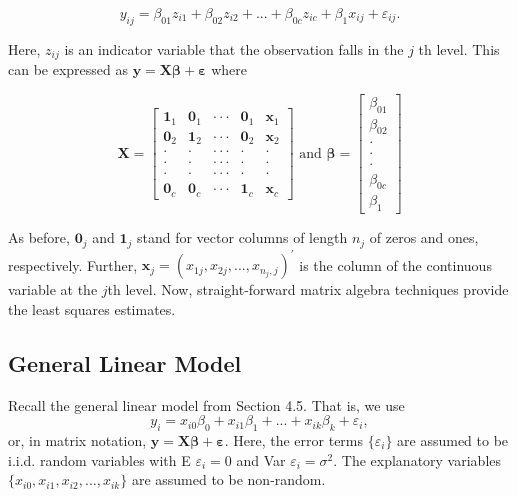 \begin{center}
\[
y_{ij}=\beta _{01}z_{i1}+\beta _{02}z_{i2}+...+\beta
_{0c}z_{ic}+\beta _{1}x_{ij}+\varepsilon_{ij}.
\]
\end{center}

\noindent Here, $z_{ij}$ is an indicator variable that the observation falls in the $j$%
th level. This can be expressed as $\mathbf{y}=%
\mathbf{X \boldsymbol \beta + \boldsymbol \varepsilon}$ where

\begin{center}
\[
\mathbf{X}=%
\begin{bmatrix}
\mathbf{1}_1 & \mathbf{0}_{1} & \cdot \cdot \cdot  & \mathbf{0}%
_{1} & \mathbf{x}_{1} \\
\mathbf{0}_{2} & \mathbf{1}_2 & \cdot \cdot \cdot  & \mathbf{0}%
_{2} & \mathbf{x}_{2} \\
\cdot  & \cdot  & \cdot \cdot \cdot  & \cdot  & \cdot  \\
\cdot  & \cdot  & \cdot \cdot \cdot  & \cdot  & \cdot  \\
\cdot  & \cdot  & \cdot \cdot \cdot  & \cdot  & \cdot  \\
\mathbf{0}_{c} & \mathbf{0}_{c} & \cdot \cdot \cdot  & \mathbf{1}_c & \mathbf{x}_{c}%
\end{bmatrix}%
\text{ \ \ \ \ and \ \ \ }\boldsymbol \beta=%
\begin{bmatrix}
\beta _{01} \\
\beta _{02} \\
\cdot  \\
\cdot  \\
\cdot  \\
\beta _{0c} \\
\beta _{1}%
\end{bmatrix}
\]
\end{center}

\noindent As before, $\mathbf{0}_{j}$ and $\mathbf{1}_j$ stand for
vector columns of length $n_{j}$ of zeros and ones, respectively.
Further, $\mathbf{x}_{j}=(x_{1j},x_{2j},...,x_{n_{j},j})^{\prime }$
is the column of the continuous variable at the $j$th level. Now,
straight-forward matrix algebra techniques provide the least squares
estimates.

\subsection{General Linear Model}

Recall the general linear model from Section 4.5. That is, we use
\begin{equation*}
y_{i}=x_{i0}\beta _{0}+x_{i1}\beta _{1}+...+x_{ik}\beta
_{k}+\varepsilon_{i},
\end{equation*}
\noindent or, in matrix notation, $ \mathbf{y=X \boldsymbol \beta +
\boldsymbol \varepsilon.}$ Here, the error terms
$\{\varepsilon_{i}\}$ are assumed to be i.i.d. random variables
with E $\varepsilon_{i}=0$ and Var $\varepsilon_{i}=\sigma ^{2}$. The explanatory variables $%
\{x_{i0},x_{i1},x_{i2},...,x_{ik}\}$ are assumed to be non-random.

